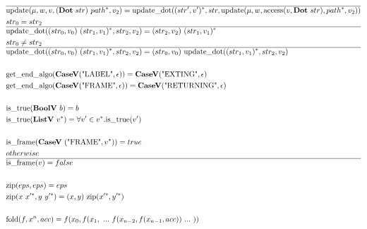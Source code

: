 \begin{align*}
  \hline
  &\update(\mu, w, v, (\dotp ~ str) ~ \seq{path}, v_2)
  =
  \updatedot(\seq{(str', v')}, str, \update(\mu, w, \access(v, \dotp ~ str), \seq{path}, v_2)) \\
  &str_0 = str_2 \\
  \hline
  &\updatedot((str_0, v_0) ~ \seq{(str_1, v_1)}, str_2, v_2)
  =
  (str_2, v_2) ~ \seq{(str_1, v_1)} \\
  &str_0 \not= str_2 \\
  \hline
  &\updatedot((str_0, v_0) ~ \seq{(str_1, v_1)}, str_2, v_2)
  =
  (str_0, v_0) ~ \updatedot(\seq{(str_1, v_1)}, str_2, v_2) \\
%
\newline \\
  &\getendalgo(\casev(\text{"LABEL"}, \epsilon)) = \casev(\text{"EXTING"}, \epsilon) \\
  &\getendalgo(\casev(\text{"FRAME"}, \epsilon)) = \casev(\text{"RETURNING"}, \epsilon) \\
%
\newline \\
  &\istrue(\boolv ~ b) = b \\
  &\istrue(\listv ~ \seq v) = \forall v' \in \seq v. \istrue (v') \\
%
\newline \\
  &\isframe(\casev ~ (\text{"FRAME"}, \seq v)) = true \\
  &otherwise \\
  \hline
  &\isframe(v) = false \\
%
\newline \\
  &\zip(eps, eps) = eps \\
  &\zip(x ~ \seq{x'}, y ~ \seq{y'}) = (x, y) ~ \zip (\seq{x'}, \seq{y'}) \\
%
\newline \\
  &\fold(f, x^n, acc) = f(x_0, f(x_1, ~ ... ~ f(x_{n-2}, f(x_{n-1}, acc)) ~ ... ~ ))
\end{align*}





